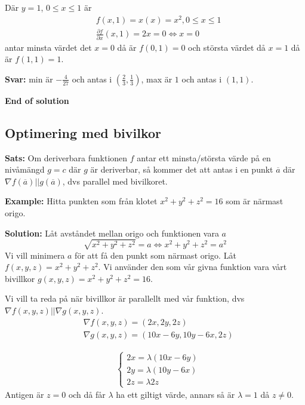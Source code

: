 Där $y=1$, $0\leq x \leq1$ är
\begin{align*}
    &f(x,1) = x(x) = x^2, 0\leq x \leq1 \\
    &\frac{\partial f}{\partial x}(x,1) = 2x = 0 \Leftrightarrow x = 0
\end{align*}
antar minsta värdet det $x=0$ då är $f(0,1) = 0$ och största värdet då
$x=1$ då är $f(1,1)=1$.

\textbf{Svar:} min är $-\frac{4}{27}$ och antas i $(\frac{2}{3}, \frac{1}{3})$,
max är $1$ och antas i $(1,1)$.

\textbf{End of solution}


\subsection{Optimering med bivilkor}

\textbf{Sats:}
Om deriverbara funktionen $f$ antar ett minsta/största värde på en nivåmängd
$g=c$ där $g$ är deriverbar, så kommer det att antas i en punkt $\overline{a}$
där $\nabla f(\overline{a}) || g(\overline{a})$, dvs parallel med bivilkoret.

\textbf{Example:}
Hitta punkten som från klotet $x^2+y^2+z^2=16$ som är närmast origo.

\textbf{Solution:}
Låt avståndet mellan origo och funktionen vara $a$
\begin{equation*}
    \sqrt{x^2+y^2+z^2} = a \Leftrightarrow
    x^2+y^2+z^2 = a^2
\end{equation*}
Vi vill minimera $a$ för att få den punkt som närmast origo. 
Låt $f(x,y,z)=x^2+y^2+z^2$.
Vi använder den som vår givna funktion vara vårt bivillkor 
$g(x,y,z)=x^2+y^2+z^2=16$.

Vi vill ta reda på när bivillkor är parallellt med vår funktion, 
dvs $\nabla f(x,y,z) || \nabla g(x,y,z)$.
\begin{align*}
    &\nabla f(x,y,z) = (2x,2y,2z) \\
    &\nabla g(x,y,z) = (10x-6y, 10y-6x, 2z)
\end{align*}

\begin{align*}
    &\begin{cases}
        2x = \lambda (10x-6y) \\
        2y = \lambda (10y-6x) \\
        2z = \lambda 2z
    \end{cases}
\end{align*}
Antigen är $z=0$ och då får $\lambda$ ha ett giltigt värde, annars så är $\lambda = 1$ då $z\neq0$.

